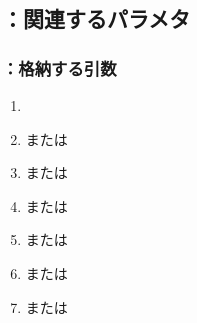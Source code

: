 \subsection{\KEndFaceCurvedOutCChamferRLeft：関連するパラメタ}

\subsubsection{\KEndFaceCurvedOutCChamferRLeft：格納する引数}
\begin{enumerate}[label*=\sarrow]
\item \PMChamferType
\item \PMTopOutcutACWidth または\PMBottomOutcutACWidth
\item \PMTopOutcutBDWidth または\PMBottomOutcutBDWidth
\item \PMTopOutcutCornerR または\PMBottomOutcutCornerR
\item \PMTopEndFaceOutCChamferLength または\PMBottomEndFaceOutCChamferLength
\item \PMTopEndFaceOutRChamferRadius または\PMBottomEndFaceOutRChamferRadius
\item \PMTopReAlocationLength または\PMBottomReAlocationLength
\end{enumerate}

\clearpage
